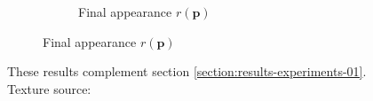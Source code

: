 \begin{figure}[]
\begin{subfigure}{\textwidth}
\begin{subfigure}{0.24\textwidth}
            \caption*{Final appearance \(r(\bm{p})\)}
        \end{subfigure}
    \end{subfigure}
    \caption{These results complement section \ref{section:results-experiments-01}. Texture source: \citet{Gatys2015}}
    \label{fig:ex01-complete-pebbles-1000steps}
\end{figure}

